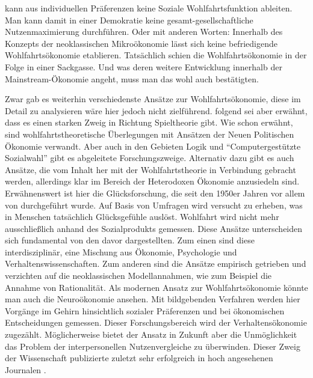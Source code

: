 kann aus individuellen Präferenzen keine Soziale Wohlfahrtsfunktion ableiten. Man kann damit in einer Demokratie keine gesamt-gesellschaftliche Nutzenmaximierung durchführen. Oder mit anderen Worten: Innerhalb des Konzepts der neoklassischen Mikroökonomie lässt sich keine befriedigende Wohlfahrtsökonomie etablieren. Tatsächlich schien die Wohlfahrtsökonomie in der Folge in einer Sackgasse. Und was deren weitere Entwicklung innerhalb der Mainstream-Ökonomie angeht, muss man das wohl auch bestätigten. 

Zwar gab es weiterhin verschiedenste Ansätze zur Wohlfahrtsökonomie, diese im Detail zu analysieren wäre hier jedoch nicht zielführend. \textcite{Fleurbaey2021} folgend sei aber erwähnt, dass es einen starken Zweig in Richtung Spieltheorie gibt. Wie schon erwähnt, sind wohlfahrtstheoretische Überlegungen mit Ansätzen der Neuen Politischen Ökonomie verwandt. Aber auch in den Gebieten Logik und "`Computergestützte Sozialwahl"' gibt es abgeleitete Forschungszweige. Alternativ dazu gibt es auch Ansätze, die vom Inhalt her mit der Wohlfahrtstheorie in Verbindung gebracht werden, allerdings klar im Bereich der Heterodoxen Ökonomie anzusiedeln sind. Erwähnenswert ist hier die Glücksforschung, die seit den 1950er Jahren vor allem von \textcite{Easterlin1974} durchgeführt wurde. Auf Basis von Umfragen wird versucht zu erheben, was in Menschen tatsächlich Glücksgefühle auslöst. Wohlfahrt wird nicht mehr ausschließlich anhand des Sozialprodukts gemessen. Diese Ansätze unterscheiden sich fundamental von den davor dargestellten. Zum einen sind diese interdisziplinär, eine Mischung aus Ökonomie, Psychologie und Verhaltenswissenschaften. Zum anderen sind die Ansätze empirisch getrieben und verzichten auf die neoklassischen Modellannahmen, wie zum Beispiel die Annahme von Rationalität. Als modernen Ansatz zur Wohlfahrtsökonomie könnte man auch die Neuroökonomie ansehen. Mit bildgebenden Verfahren werden hier Vorgänge im Gehirn hinsichtlich sozialer Präferenzen und bei ökonomischen Entscheidungen gemessen. Dieser Forschungsbereich wird der Verhaltensökonomie zugezählt. Möglicherweise bietet der Ansatz in Zukunft aber die Unmöglichkeit das Problem der interpersonellen Nutzenvergleiche zu überwinden. Dieser Zweig der Wissenschaft publizierte zuletzt sehr erfolgreich in hoch angesehenen Journalen \parencite{Fehr2000, Fehr2003}.

